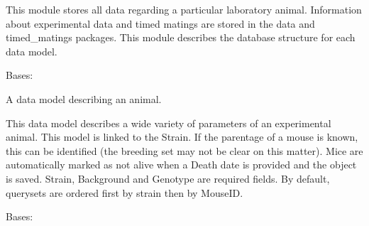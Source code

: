 \documentclass[letterpaper,10pt,english]{sphinxmanual}
\begin{document}
This module stores all data regarding a particular laboratory animal.  Information about experimental data and timed matings are stored in the data and timed\_matings packages.  This module describes the database structure for each data model.


\begin{fulllineitems}
\label{api:mousedb.animal.models.Animal}
Bases: 

A data model describing an animal.

This data model describes a wide variety of parameters of an experimental animal.  This model is linked to the Strain.  If the parentage of a mouse is known, this can be identified (the breeding set may not be clear on this matter). Mice are automatically marked as not alive when a Death date is provided and the object is saved.  Strain, Background and Genotype are required fields.  By default, querysets are ordered first by strain then by MouseID.


\begin{fulllineitems}
\label{api:mousedb.animal.models.Animal.Breeding}
\end{fulllineitems}



\begin{fulllineitems}
\label{api:mousedb.animal.models.Animal.DoesNotExist}
Bases: 

\end{fulllineitems}



\begin{fulllineitems}
\label{api:mousedb.animal.models.Animal.Father}
\end{fulllineitems}



\begin{fulllineitems}
\label{api:mousedb.animal.models.Animal.Mother}
\end{fulllineitems}



\end{fulllineitems}
\end{document}
